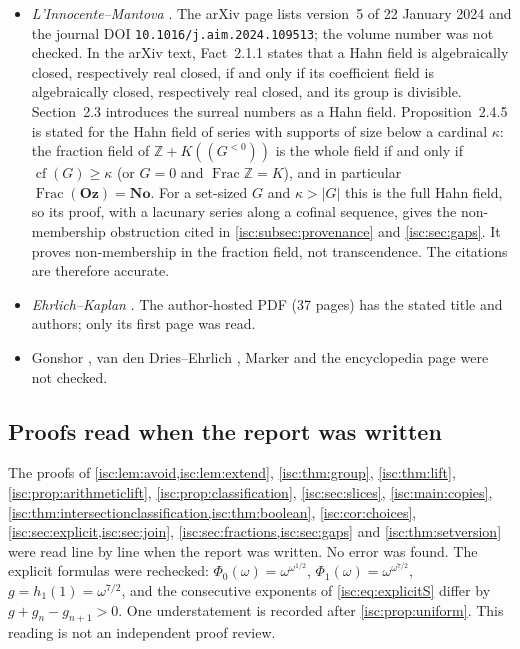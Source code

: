 \documentclass[11pt,letterpaper]{article}
\theoremstyle{definition}
\theoremstyle{remark}
\newcommand{\No}{\mathbf{No}}
\newcommand{\Oz}{\mathbf{Oz}}
\newcommand{\Z}{\mathbb Z}
\newcommand{\Frac}{\operatorname{Frac}}
\newcommand{\cf}{\operatorname{cf}}
\numberwithin{equation}{section}
\begin{document}
\begin{itemize}[leftmargin=*,itemsep=3pt]
\item \emph{L'Innocente--Mantova} \cite{LM}. The arXiv page lists version~5
of 22 January 2024 and the journal DOI
\nolinkurl{10.1016/j.aim.2024.109513}; the volume number was not checked.
In the arXiv text, Fact~2.1.1 states that a Hahn field is algebraically
closed, respectively real closed, if and only if its coefficient field is
algebraically closed, respectively real closed, and its group is divisible.
Section~2.3 introduces the surreal numbers as a Hahn field. Proposition~2.4.5
is stated for the Hahn field of series with supports of size below a
cardinal $\kappa$: the fraction field of $\Z+K((G^{<0}))$ is the whole field
if and only if $\cf(G)\ge\kappa$ (or $G=0$ and $\Frac\Z=K$), and in
particular $\Frac(\Oz)=\No$. For a set-sized $G$ and $\kappa>\lvert G\rvert$ this is
the full Hahn field, so its proof, with a lacunary series along a cofinal
sequence, gives the non-membership obstruction cited in
\cref{isc:subsec:provenance} and \cref{isc:sec:gaps}. It proves
non-membership in the fraction field, not transcendence. The citations are
therefore accurate.
\item \emph{Ehrlich--Kaplan} \cite{EK}. The author-hosted PDF (37 pages) has
the stated title and authors; only its first page was read.
\item Gonshor \cite{Gonshor}, van den Dries--Ehrlich \cite{vdDE}, Marker
\cite{Marker} and the encyclopedia page \cite{Wiki} were not checked.
\end{itemize}

\subsection{Proofs read when the report was written}\label{isc:app:checked}

The proofs of \cref{isc:lem:avoid,isc:lem:extend}, \cref{isc:thm:group},
\cref{isc:thm:lift}, \cref{isc:prop:arithmeticlift},
\cref{isc:prop:classification}, \cref{isc:sec:slices}, \cref{isc:main:copies},
\cref{isc:thm:intersectionclassification,isc:thm:boolean},
\cref{isc:cor:choices}, \cref{isc:sec:explicit,isc:sec:join},
\cref{isc:sec:fractions,isc:sec:gaps} and \cref{isc:thm:setversion} were
read line by line when the report was written. No error was found. The
explicit formulas were rechecked: $\Phi_0(\omega)=\omega^{\omega^{1/2}}$,
$\Phi_1(\omega)=\omega^{\omega^{7/2}}$, $g=h_1(1)=\omega^{7/2}$, and the
consecutive exponents of \eqref{isc:eq:explicitS} differ by
$g+g_n-g_{n+1}>0$. One understatement is recorded after
\cref{isc:prop:uniform}. This reading is not an independent proof review.
\end{document}
